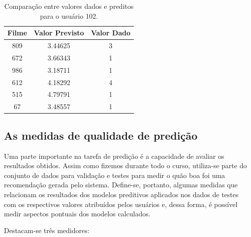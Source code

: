 \FloatBarrier
	
	\begin{table}[h]
	    \centering
		\caption{\label{tab:scoal_102} Comparação entre valores dados e preditos para
		o usuário 102.}
		\begin{tabular}{| c | c | c | }
			\hline
			\textbf{Filme} & \textbf{Valor Previsto} & \textbf{Valor Dado} \\ \hline
			809 & 3.44625 & 3 \\ \hline
			672 & 3.66343 & 1 \\ \hline
			986 & 3.18711 & 1 \\ \hline
			612 & 4.18292 & 4\\ \hline
			515 & 4.79791 & 1 \\ \hline
			67  & 3.48557 & 1 \\ \hline
		\end{tabular}	    
    \end{table}
    
    \FloatBarrier

\subsection {As medidas de qualidade de predição}

Uma parte importante na tarefa de predição é a capacidade de avaliar os
resultados obtidos. Assim como fizemos durante todo o curso, utiliza-se parte do
conjunto de dados para validação e testes para medir o quão boa foi uma
recomendação gerada pelo sistema. Define-se, portanto, algumas medidas que
relacionam os resultados dos modelos preditivos aplicados nos dados de testes
com os respectivos valores atribuídos pelos usuários e, dessa forma, é possível
medir aspectos pontuais dos modelos calculados.

\vspace{12pt}

Destacam-se três medidores:

